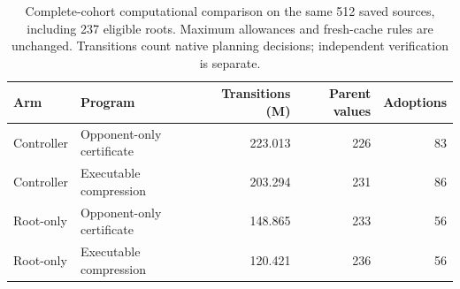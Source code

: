 \begin{table}[htbp]
\centering
\begin{tabular}{llrrr}
\toprule
Arm & Program & Transitions (M) & Parent values & Adoptions \\
\midrule
Controller & Opponent-only certificate & 223.013 & 226 & 83 \\
Controller & Executable compression & 203.294 & 231 & 86 \\
Root-only & Opponent-only certificate & 148.865 & 233 & 56 \\
Root-only & Executable compression & 120.421 & 236 & 56 \\
\bottomrule
\end{tabular}
\caption{Complete-cohort computational comparison on the same 512 saved sources, including 237 eligible roots. Maximum allowances and fresh-cache rules are unchanged. Transitions count native planning decisions; independent verification is separate.}
\label{tab:symbolic-comparison}
\end{table}
